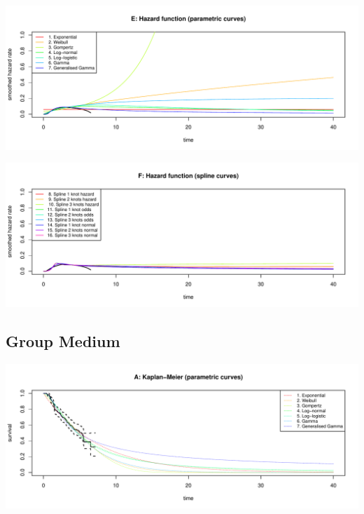 \documentclass[]{article}
\begin{document}
\begin{flushleft}\includegraphics[height=0.29\textheight]{Images/validate_extrapolation1-5} \end{flushleft}

\begin{flushleft}\includegraphics[height=0.29\textheight]{Images/validate_extrapolation1-6} \end{flushleft}

\newpage

\subsection{Group Medium}\label{group-medium}

\begin{flushleft}\includegraphics[height=0.29\textheight]{Images/validate_extrapolation2-1} \end{flushleft}
\end{document}
